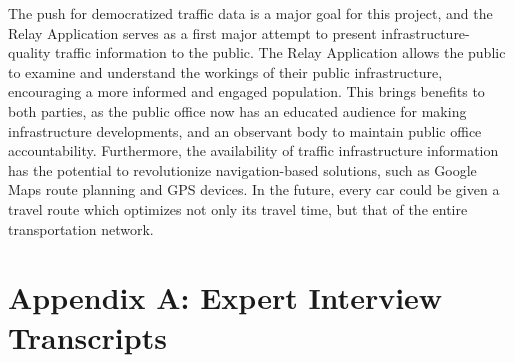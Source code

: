 \documentclass{report}
\begin{document}
The push for democratized traffic data is a major goal for this project, and the Relay Application serves as a first major attempt to present infrastructure-quality traffic information to the public. The Relay Application allows the public to examine and understand the workings of their public infrastructure, encouraging a more informed and engaged population. This brings benefits to both parties, as the public office now has an educated audience for making infrastructure developments, and an observant body to maintain public office accountability. Furthermore, the availability of traffic infrastructure information has the potential to revolutionize navigation-based solutions, such as Google Maps route planning and GPS devices. In the future, every car could be given a travel route which optimizes not only its travel time, but that of the entire transportation network.


\newpage
\section{Appendix A: Expert Interview Transcripts}
\end{document}
